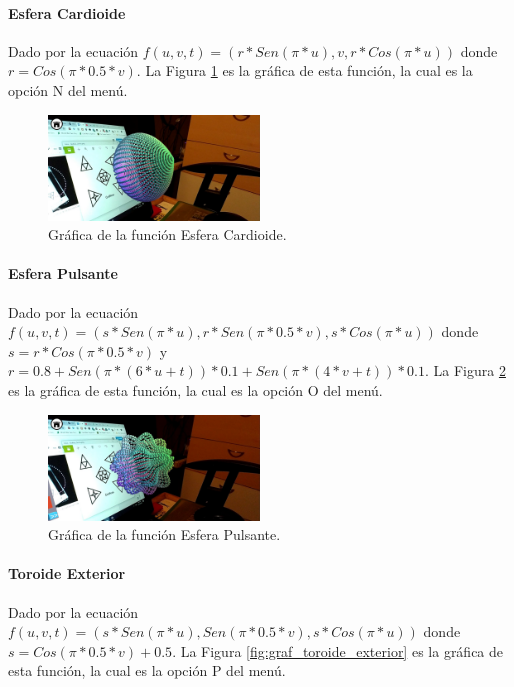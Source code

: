 \paragraph{Esfera Cardioide}
Dado por la ecuación $f(u,v,t)=(r*Sen(\pi * u), v, r*Cos(\pi * u))$ donde $r = Cos(\pi * 0.5 * v)$. La Figura \ref{fig:graf_esfera_cardioide} es la gráfica de esta función, la cual es la opción N del menú.

\begin{figure}[hbt!]
\centering
\includegraphics[width=0.5\textwidth]{figuras/graficas/esfera_cardioide.png}
\caption{\label{fig:graf_esfera_cardioide}Gráfica de la función Esfera Cardioide.}
\end{figure}
\FloatBarrier

\paragraph{Esfera Pulsante}
Dado por la ecuación $f(u,v,t)=(s*Sen(\pi * u), r * Sen(\pi * 0.5 * v), s*Cos(\pi * u))$ donde $s = r*Cos(\pi * 0.5 * v)$ y $r=0.8 + Sen(\pi * (6 * u + t)) * 0.1 + Sen(\pi * (4 * v + t)) * 0.1$. La Figura \ref{fig:graf_esfera_pulsante} es la gráfica de esta función, la cual es la opción O del menú.

\begin{figure}[hbt!]
\centering
\includegraphics[width=0.5\textwidth]{figuras/graficas/esfera_pulsante.png}
\caption{\label{fig:graf_esfera_pulsante}Gráfica de la función Esfera Pulsante.}
\end{figure}
\FloatBarrier

\paragraph{Toroide Exterior}
Dado por la ecuación $f(u,v,t)=(s*Sen(\pi * u), Sen(\pi * 0.5 * v), s*Cos(\pi * u))$ donde $s = Cos(\pi * 0.5 * v) + 0.5$. La Figura \ref{fig:graf_toroide_exterior} es la gráfica de esta función, la cual es la opción P del menú.

